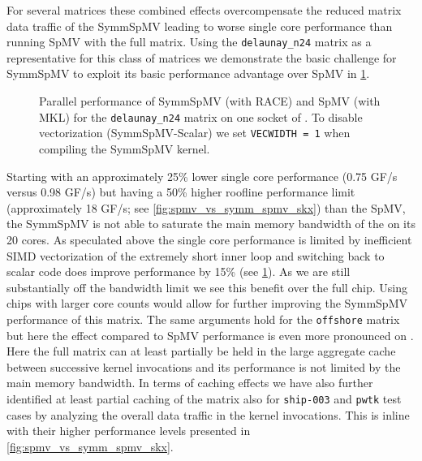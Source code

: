  For several matrices these combined effects overcompensate the reduced matrix data traffic of the \acrshort{SymmSpMV} leading to worse single core performance than running \acrshort{SpMV} with the full matrix. Using the \texttt{delaunay\_n24} matrix as a representative for this class of matrices we demonstrate the basic challenge for \acrshort{SymmSpMV} to exploit its basic performance advantage over \acrshort{SpMV} in \cref{fig:scaling_delaunay}.
  \begin{figure}[tbp]
  	\centering
  	\caption{Parallel performance  of \acrshort{SymmSpMV} (with \acrshort{RACE})  and \acrshort{SpMV} (with \acrshort{MKL}) for the \texttt{delaunay\_n24} matrix on one socket of \SKX. To disable vectorization (SymmSpMV-Scalar) we set \texttt{VECWIDTH = 1} when compiling the \acrshort{SymmSpMV} kernel.}
  	\label{fig:scaling_delaunay}
  \end{figure}
%
Starting with an approximately 25\% lower single core performance (0.75 GF/s versus 0.98 GF/s) but having a 50\% higher roofline performance limit (approximately 18 GF/s; see \cref{fig:spmv_vs_symm_spmv_skx}) than the \acrshort{SpMV}, the \acrshort{SymmSpMV} is not able to saturate the main memory bandwidth of the \SKX on its 20 cores. As speculated above the single core performance is limited by inefficient SIMD vectorization of the extremely short inner loop and switching back to scalar code does improve performance by 15\% (see \cref{fig:scaling_delaunay}). As we are still substantially off the bandwidth limit we see this benefit over the full chip. Using chips with larger core counts would allow for further improving the \acrshort{SymmSpMV} performance of this matrix. The same arguments hold for the \texttt{offshore} matrix but here the effect compared to \acrshort{SpMV} performance is even more pronounced on \SKX.  Here the full matrix can at least partially be held in the large aggregate cache between successive kernel invocations and its performance is not limited by the main memory bandwidth. In terms of caching effects we have also further identified at least partial caching of the matrix also for \texttt{ship-003} and \texttt{pwtk} test cases by analyzing the overall data traffic in the kernel invocations. This is inline with their higher performance levels presented in \cref{fig:spmv_vs_symm_spmv_skx}. 


